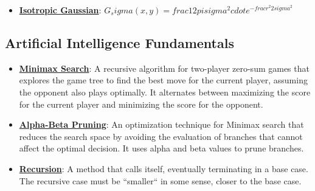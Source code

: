 \documentclass{article}%
\begin{document}
\begin{itemize}[leftmargin=*]
\item \href{https://purdue.brightspace.com/d2l/common/assets/pdfjs-d2l-dist/1.0.14-legacy/web/viewer.html?file=\%2Fcontent\%2Fenforced\%2F1095467-wl.202510.CS.24300.001\%2F08L2-Feature Extraction.pdf\%3Fou\%3D1095467\&lang=en-us\&container=d2l-fileviewer-rendered-pdf\&fullscreen=d2l-fileviewer-rendered-pdf-dialog\&height=667#page=43}{\textbf{Isotropic Gaussian}}: $G_sigma(x, y) = frac{1}{2pisigma^2} cdot e^{-frac{r^2}{2sigma^2}}$%
\end{itemize}

%
\subsection{Artificial Intelligence Fundamentals}%
\label{subsec:ArtificialIntelligenceFundamentals}%
\begin{itemize}[leftmargin=*]%
\item \href{https://purdue.brightspace.com/d2l/common/assets/pdfjs-d2l-dist/1.0.14-legacy/web/viewer.html?file=\%2Fcontent\%2Fenforced\%2F1095467-wl.202510.CS.24300.001\%2F02L2-Intro.pdf\%3Fou\%3D1095467\&lang=en-us\&container=d2l-fileviewer-rendered-pdf\&fullscreen=d2l-fileviewer-rendered-pdf-dialog\&height=667#page=22}{\textbf{Minimax Search}}: A recursive algorithm for two-player zero-sum games that explores the game tree to find the best move for the current player, assuming the opponent also plays optimally. It alternates between maximizing the score for the current player and minimizing the score for the opponent.%
\item \href{https://purdue.brightspace.com/d2l/common/assets/pdfjs-d2l-dist/1.0.14-legacy/web/viewer.html?file=\%2Fcontent\%2Fenforced\%2F1095467-wl.202510.CS.24300.001\%2F02L2-Intro.pdf\%3Fou\%3D1095467\&lang=en-us\&container=d2l-fileviewer-rendered-pdf\&fullscreen=d2l-fileviewer-rendered-pdf-dialog\&height=667#page=23}{\textbf{Alpha-Beta Pruning}}: An optimization technique for Minimax search that reduces the search space by avoiding the evaluation of branches that cannot affect the optimal decision. It uses alpha and beta values to prune branches.%
\item \href{https://purdue.brightspace.com/d2l/common/assets/pdfjs-d2l-dist/1.0.14-legacy/web/viewer.html?file=\%2Fcontent\%2Fenforced\%2F1095467-wl.202510.CS.24300.001\%2F14L1-DepthFS.pdf\%3Fou\%3D1095467\&lang=en-us\&container=d2l-fileviewer-rendered-pdf\&fullscreen=d2l-fileviewer-rendered-pdf-dialog\&height=667#page=3}{\textbf{Recursion}}: A method that calls itself, eventually terminating in a base case. The recursive case must be ``smaller`` in some sense, closer to the base case.%

\end{itemize}
\end{document}
